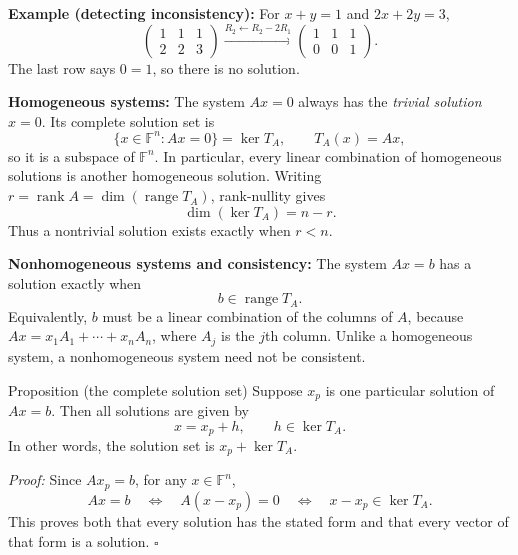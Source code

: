 \documentclass[a4paper,11pt,abstract=true]{scrartcl}
\theoremstyle{dotlessP}
\theoremstyle{dotlessS}
\theoremstyle{remark}
\theoremstyle{definition}
\begin{document}
\begin{example_box}
\textbf{Example (detecting inconsistency):} For
$x+y=1$ and $2x+2y=3$,
\[
\left(\begin{array}{cc|c}1&1&1\\2&2&3\end{array}\right)
\xrightarrow{R_2\leftarrow R_2-2R_1}
\left(\begin{array}{cc|c}1&1&1\\0&0&1\end{array}\right).
\]
The last row says $0=1$, so there is no solution.
\end{example_box}

\begin{claim_box}
\textbf{Homogeneous systems:} The system $Ax=0$ always has the
\emph{trivial solution} $x=0$. Its complete solution set is
\[
\{x\in\mathbb{F}^n:Ax=0\}=\ker T_A,
\qquad T_A(x)=Ax,
\]
so it is a subspace of $\mathbb{F}^n$. In particular, every linear
combination of homogeneous solutions is another homogeneous solution.
Writing $r=\operatorname{rank}A=\dim(\operatorname{range}T_A)$,
rank-nullity gives
\[
\dim(\ker T_A)=n-r.
\]
Thus a nontrivial solution exists exactly when $r<n$.
\end{claim_box}

\begin{claim_box}
\textbf{Nonhomogeneous systems and consistency:} The system
$Ax=b$ has a solution exactly when
\[
b\in\operatorname{range}T_A.
\]
Equivalently, $b$ must be a linear combination of the columns of $A$,
because $Ax=x_1 A_1+\cdots+x_n A_n$, where $A_j$ is the $j$th column.
Unlike a homogeneous system, a nonhomogeneous system need not be
consistent.
\end{claim_box}

\begin{mainbox}{Proposition (the complete solution set)}
Suppose $x_p$
is one particular solution of $Ax=b$. Then all solutions are given by
\[
x=x_p+h,\qquad h\in\ker T_A.
\]
In other words, the solution set is $x_p+\ker T_A$.
\end{mainbox}

\begin{claim_box}
\textit{Proof:} Since $Ax_p=b$, for any $x\in\mathbb{F}^n$,
\[
Ax=b\quad\Longleftrightarrow\quad A(x-x_p)=0
\quad\Longleftrightarrow\quad x-x_p\in\ker T_A.
\]
This proves both that every solution has the stated form and that every
vector of that form is a solution. \hfill$\square$
\end{claim_box}
\end{document}
